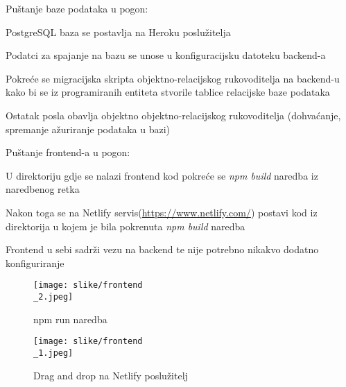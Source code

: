 			Puštanje baze podataka u pogon:
			\begin{packed_item}
				\item PostgreSQL baza se postavlja na Heroku poslužitelja
				\item Podatci za spajanje na bazu se unose u konfiguracijsku datoteku backend-a
				\item Pokreće se migracijska skripta objektno-relacijskog rukovoditelja na backend-u kako bi se iz programiranih entiteta stvorile tablice relacijske baze podataka
				\item Ostatak posla obavlja objektno objektno-relacijskog rukovoditelja (dohvaćanje, spremanje ažuriranje podataka u bazi)
			\end{packed_item}
		
			Puštanje frontend-a u pogon:
			\begin{packed_item}
				\item U direktoriju gdje se nalazi frontend kod pokreće se \textit{npm build} naredba iz naredbenog retka
				\item Nakon toga se na Netlify servis(\url{https://www.netlify.com/}) postavi kod iz direktorija u kojem je bila pokrenuta \textit{npm build} naredba
				\item Frontend u sebi sadrži vezu na backend te nije potrebno nikakvo dodatno konfiguriranje
			
			
				\begin{figure}[H]
					\texttt{[image: slike/frontend\\\_2.jpeg]} %
					\centering
					\caption{npm run naredba}
					\label{fig:npmnaredba}
				\end{figure}
			
				\begin{figure}[H]
					\texttt{[image: slike/frontend\\\_1.jpeg]} %
					\centering
					\caption{Drag and drop na Netlify poslužitelj}
					\label{fig:netlify}
				\end{figure}
			\end{packed_item}
		
